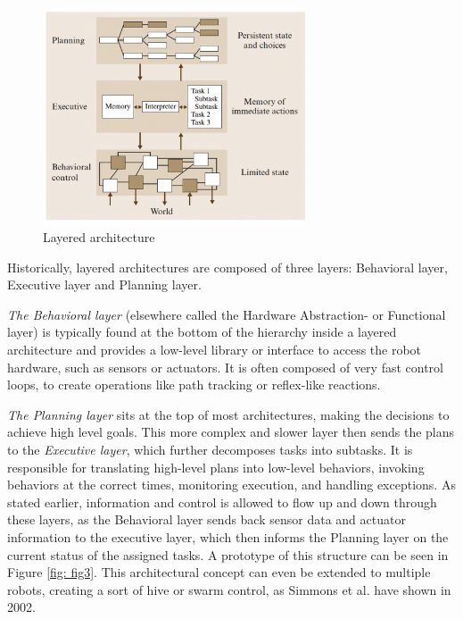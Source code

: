 \documentclass[%
paper=A4,               %
twoside=true,           %
openright,              %
11pt,                   %
bibliography=totoc,     %
titlepage=on,           %
DIV=12,                 %
BCOR=1.5cm,             %
parskip=half,            %
final
]{scrreprt}
\begin{document}
	\begin{figure}[ht]
		\centering
		\includegraphics[width=0.7\textwidth]{Graphics/LayeredArchitecture}
		\caption{Layered architecture \autocite{brooksRobustLayeredControl1986}}
		\label{fig: fig2}
	\end{figure}
	
	Historically, layered architectures are composed of three layers: Behavioral layer, Executive layer and Planning layer. \autocite{jun-youngjungThreelayeredHybridArchitecture2008,peterbonassoExperiencesArchitectureIntelligent1997}
	
	\textit{The Behavioral layer} (elsewhere called the Hardware Abstraction-  or Functional layer) is typically found at the bottom of the hierarchy inside a layered architecture and provides a low-level library or interface to access the robot hardware, such as sensors or actuators. \autocite{jun-youngjungThreelayeredHybridArchitecture2008,simmonsLayeredArchitectureCoordination2002} It is often composed of very fast control loops, to create operations like path tracking or reflex-like reactions. \autocite{schillingAutonomeSystemeUnd2023} 
	
	\textit{The Planning layer} sits at the top of most architectures, making the decisions to achieve high level goals. This more complex and slower layer then sends the plans to the \textit{Executive layer}, which further decomposes tasks into subtasks. It is responsible for translating high-level plans into low-level behaviors, invoking behaviors at the correct times, monitoring execution, and handling exceptions. \autocite{schillingAutonomeSystemeUnd2023,simmonsLayeredArchitectureCoordination2002,volpeCLARAtyArchitectureRobotic2001} 
	As stated earlier, information and control is allowed to flow up and down through these layers, as the Behavioral layer sends back sensor data and actuator  information to the executive layer, which then informs the Planning layer on the current status of the assigned tasks. \autocite{jun-youngjungThreelayeredHybridArchitecture2008} A prototype of this structure can be seen in Figure \ref{fig: fig3}. 
	This architectural concept can even be extended to multiple robots, creating a sort of hive or swarm control, as Simmons et al. have shown in 2002. \autocite{simmonsLayeredArchitectureCoordination2002}
	
\end{document}

